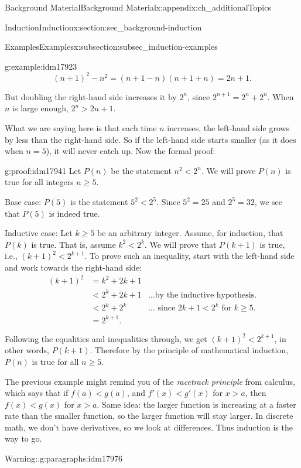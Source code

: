 \documentclass[oneside,10pt,]{book}
\numberwithin{equation}{chapter}
\newcommand{\lt}{<}
\newcommand{\amp}{&}
\begin{document}
\begin{appendixptx}{Background Material}{}{Background Material}{}{}{x:appendix:ch_additionalTopics}
\begin{sectionptx}{Induction}{}{Induction}{}{}{x:section:sec_background-induction}
\begin{subsectionptx}{Examples}{}{Examples}{}{}{x:subsection:subsec_induction-examples}
\begin{example}{}{g:example:idm17923}
\begin{equation*}
(n+1)^2 - n^2 = (n+1-n)(n+1+n) = 2n+1.
\end{equation*}
%
\par
But doubling the right-hand side increases it by \(2^n\), since \(2^{n+1} = 2^n + 2^n\). When \(n\) is large enough, \(2^n > 2n + 1\).%
\par
What we are saying here is that each time \(n\) increases, the left-hand side grows by less than the right-hand side. So if the left-hand side starts smaller (as it does when \(n = 5\)), it will never catch up. Now the formal proof:%
\begin{proofptx}{}{g:proof:idm17941}
Let \(P(n)\) be the statement \(n^2 \lt  2^n\). We will prove \(P(n)\) is true for all integers \(n \ge 5\).%
\par
Base case: \(P(5)\) is the statement \(5^2 \lt  2^5\). Since \(5^2 = 25\) and \(2^5 = 32\), we see that \(P(5)\) is indeed true.%
\par
Inductive case: Let \(k \ge 5\) be an arbitrary integer. Assume, for induction, that \(P(k)\) is true. That is, assume \(k^2 \lt  2^k\). We will prove that \(P(k+1)\) is true, i.e., \((k+1)^2 \lt  2^{k+1}\). To prove such an inequality, start with the left-hand side and work towards the right-hand side:%
\begin{align*}
(k+1)^2 \amp = k^2 + 2k + 1 \amp\\
\amp \lt 2^k + 2k + 1 \amp \ldots\text{by the inductive hypothesis.}\\
\amp \lt 2^k + 2^k \amp \ldots\text{ since } 2k + 1 \lt  2^k \text{ for }k \ge 5.\\
\amp = 2^{k+1}. \amp
\end{align*}
%
\par
Following the equalities and inequalities through, we get \((k+1)^2 \lt  2^{k+1}\), in other words, \(P(k+1)\). Therefore by the principle of mathematical induction, \(P(n)\) is true for all \(n \ge 5\).%
\end{proofptx}
\end{example}
The previous example might remind you of the \emph{racetrack principle} from calculus, which says that if \(f(a) \lt  g(a)\), and \(f'(x) \lt  g'(x)\) for \(x > a\), then \(f(x) \lt  g(x)\) for \(x > a\). Same idea: the larger function is increasing at a faster rate than the smaller function, so the larger function will stay larger. In discrete math, we don't have derivatives, so we look at differences. Thus induction is the way to go.%
\begin{paragraphs}{Warning:.}{g:paragraphs:idm17976}%

\end{paragraphs}
\end{subsectionptx}
\end{sectionptx}
\end{appendixptx}
\end{document}
